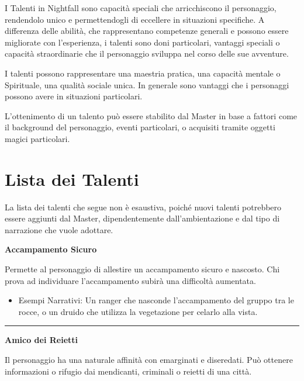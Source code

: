 \documentclass[../manuale_main.tex]{subfiles}
\begin{document}
I Talenti in Nightfall sono capacità speciali che arricchiscono il personaggio, rendendolo unico e permettendogli di eccellere in situazioni specifiche. A differenza delle abilità, che rappresentano competenze generali e possono essere migliorate con l’esperienza, i talenti sono doni particolari, vantaggi speciali o capacità straordinarie che il personaggio sviluppa nel corso delle sue avventure.

I talenti possono rappresentare una maestria pratica, una capacità mentale o Spirituale, una qualità sociale unica. In generale sono vantaggi che i personaggi possono avere in situazioni particolari.

L'ottenimento di un talento può essere stabilito dal Master in base a fattori come il background del personaggio, eventi particolari, o acquisiti tramite oggetti magici particolari.


\section{Lista dei Talenti}

La lista dei talenti che segue non è esaustiva, poiché nuovi talenti potrebbero essere aggiunti dal Master, dipendentemente dall'ambientazione e dal tipo di narrazione che vuole adottare.

\begin{center}
\textbf{\large{Accampamento Sicuro}}\\
\end{center}
Permette al personaggio di allestire un accampamento sicuro e nascosto. Chi prova ad individuare l'accampamento subirà una difficoltà aumentata.

\begin{itemize}
\item Esempi Narrativi: Un ranger che nasconde l'accampamento del gruppo tra le rocce, o un druido che utilizza la vegetazione per celarlo alla vista.
\end{itemize}

\vspace{0.5cm}\rule{\textwidth}{0.4pt}\vspace{1cm}

\begin{center}
\textbf{\large{Amico dei Reietti}}\\
\end{center}
Il personaggio ha una naturale affinità con emarginati e diseredati. Può ottenere informazioni o rifugio dai mendicanti, criminali o reietti di una città.
\end{document}
